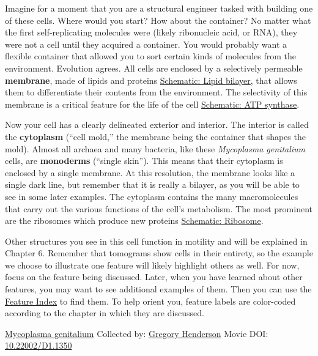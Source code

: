\documentclass[]{tufte-book}
\begin{document}
Imagine for a moment that you are a structural engineer tasked with building one of these cells. Where would you start? How about the container? No matter what the first self-replicating molecules were (likely ribonucleic acid, or RNA), they were not a cell until they acquired a container. You would probably want a flexible container that allowed you to sort certain kinds of molecules from the environment. Evolution agrees. All cells are enclosed by a selectively permeable \textbf{membrane}, made of lipids and proteins \protect\hyperlink{Lipid_bilayer}{Schematic: Lipid bilayer}, that allows them to differentiate their contents from the environment. The selectivity of this membrane is a critical feature for the life of the cell \protect\hyperlink{ATP_synthase_and_energy_production}{Schematic: ATP synthase}.

Now your cell has a clearly delineated exterior and interior. The interior is called the \textbf{cytoplasm} (``cell mold,'' the membrane being the container that shapes the mold). Almost all archaea and many bacteria, like these \emph{Mycoplasma genitalium} cells, are \textbf{monoderms} (``single skin''). This means that their cytoplasm is enclosed by a single membrane. At this resolution, the membrane looks like a single dark line, but remember that it is really a bilayer, as you will be able to see in some later examples. The cytoplasm contains the many macromolecules that carry out the various functions of the cell's metabolism. The most prominent are the ribosomes which produce new proteins \protect\hyperlink{Ribosome}{Schematic: Ribosome}.

Other structures you see in this cell function in motility and will be explained in Chapter 6. Remember that tomograms show cells in their entirety, so the example we choose to illustrate one feature will likely highlight others as well. For now, focus on the feature being discussed. Later, when you have learned about other features, you may want to see additional examples of them. Then you can use the \protect\hyperlink{feature-index}{Feature Index} to find them. To help orient you, feature labels are color-coded according to the chapter in which they are discussed.



\hypertarget{htmlwidget-f7adf9cd7718207f1d1a}{}

\label{fig:2-1}\protect\hyperlink{tree}{Mycoplasma genitalium} Collected by: \protect\hyperlink{gregory_henderson}{Gregory Henderson} Movie DOI: \href{https://doi.org/10.22002/D1.1350}{10.22002/D1.1350}
\end{document}

